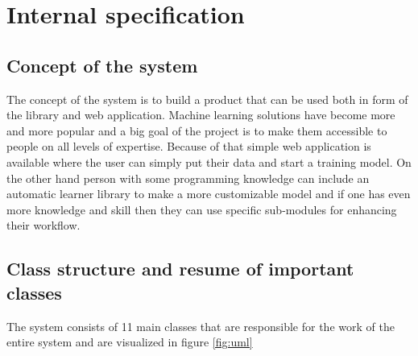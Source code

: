 \documentclass[a4paper,twoside,12pt]{book}
\begin{document}
\chapter{Internal specification}

\section{Concept of the system}

The concept of the system is to build a product that can be used both in form of the library and web application. Machine learning solutions have become more and more popular and a big goal of the project is to make them accessible to people on all levels of expertise. 
Because of that simple web application is available where the user can simply put their data and start a training model. On the other hand person with some programming knowledge can include an automatic learner library to make a more customizable model and if one has even more knowledge and skill then they can use specific sub-modules for enhancing their workflow.

\section{Class structure and resume of important classes}

The system consists of 11 main classes that are responsible for the work of the entire system and are visualized in figure \ref{fig:uml}
\end{document}
